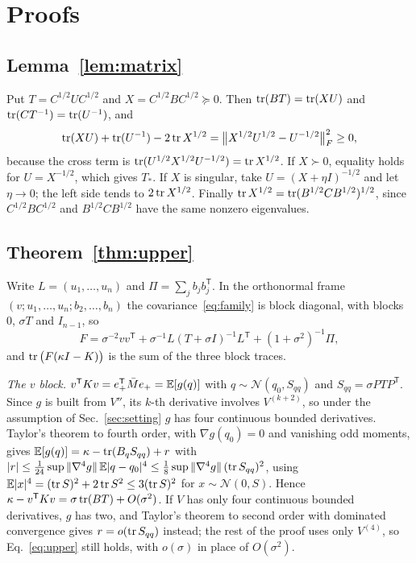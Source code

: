 \section{Proofs}
\label{app:proofs}

\subsection{Lemma~\ref{lem:matrix}}
Put $T = C^{1/2}UC^{1/2}$ and $X = C^{1/2}BC^{1/2} \succeq 0$. Then $\operatorname{tr}(BT) = \operatorname{tr}(XU)$ and $\operatorname{tr}(CT^{-1}) = \operatorname{tr}(U^{-1})$, and
\begin{equation}
\operatorname{tr}(XU) + \operatorname{tr}(U^{-1}) - 2\operatorname{tr} X^{1/2} = \big\|X^{1/2}U^{1/2} - U^{-1/2}\big\|_F^2 \geq 0,
\end{equation}
because the cross term is $\operatorname{tr}(U^{1/2}X^{1/2}U^{-1/2}) = \operatorname{tr} X^{1/2}$. If $X \succ 0$, equality holds for $U = X^{-1/2}$, which gives $T_*$. If $X$ is singular, take $U = (X + \eta I)^{-1/2}$ and let $\eta \to 0$; the left side tends to $2\operatorname{tr} X^{1/2}$. Finally $\operatorname{tr} X^{1/2} = \operatorname{tr}(B^{1/2}CB^{1/2})^{1/2}$, since $C^{1/2}BC^{1/2}$ and $B^{1/2}CB^{1/2}$ have the same nonzero eigenvalues.

\subsection{Theorem~\ref{thm:upper}}
Write $L = (u_1,\dots,u_n)$ and $\Pi = \sum_j b_jb_j^{\mathsf T}$. In the orthonormal frame $(v; u_1,\dots,u_n; b_2,\dots,b_n)$ the covariance~\eqref{eq:family} is block diagonal, with blocks $0$, $\sigma T$ and $I_{n-1}$, so
\begin{equation}
F = \sigma^{-2}vv^{\mathsf T} + \sigma^{-1}L(T + \sigma I)^{-1}L^{\mathsf T} + (1+\sigma^2)^{-1}\Pi,
\end{equation}
and $\operatorname{tr}\big(F(\kappa I - K)\big)$ is the sum of the three block traces.

\emph{The $v$ block.} $v^{\mathsf T}Kv = e_+^{\mathsf T}\bar Me_+ = \mathbb{E}[g(q)]$ with $q \sim \mathcal N(q_0, S_{qq})$ and $S_{qq} = \sigma PTP^{\mathsf T}$. Since $g$ is built from $V''$, its $k$-th derivative involves $V^{(k+2)}$, so under the assumption of Sec.~\ref{sec:setting} $g$ has four continuous bounded derivatives. Taylor's theorem to fourth order, with $\nabla g(q_0) = 0$ and vanishing odd moments, gives $\mathbb{E}[g(q)] = \kappa - \operatorname{tr}(B_qS_{qq}) + r$ with $|r| \leq \tfrac1{24}\sup\|\nabla^4 g\|\,\mathbb{E}|q-q_0|^4 \leq \tfrac18\sup\|\nabla^4 g\|\,(\operatorname{tr} S_{qq})^2$, using $\mathbb{E}|x|^4 = (\operatorname{tr} S)^2 + 2\operatorname{tr} S^2 \leq 3(\operatorname{tr} S)^2$ for $x \sim \mathcal N(0,S)$. Hence $\kappa - v^{\mathsf T}Kv = \sigma\operatorname{tr}(BT) + O(\sigma^2)$. If $V$ has only four continuous bounded derivatives, $g$ has two, and Taylor's theorem to second order with dominated convergence gives $r = o(\operatorname{tr} S_{qq})$ instead; the rest of the proof uses only $V^{(4)}$, so Eq.~\eqref{eq:upper} still holds, with $o(\sigma)$ in place of $O(\sigma^2)$.

